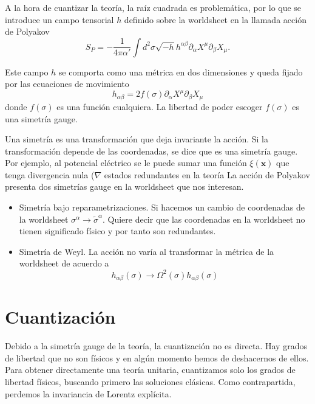 A la hora de cuantizar la teoría, la raíz cuadrada es problemática, por lo que se introduce
un campo tensorial $h$ definido sobre la worldsheet en la llamada acción de Polyakov
\begin{equation}
  S_P=-\frac{1}{4\pi\alpha'}\int d^2\sigma  \sqrt{-h}h^{\alpha\beta}\partial_\alpha X^\mu \partial_\beta X_\mu.
\end{equation}

Este campo $h$ se comporta como una métrica en dos dimensiones y queda fijado por las
ecuaciones de movimiento
\begin{equation}
  h_{\alpha\beta}=2f(\sigma)\partial_\alpha X^\mu \partial_\beta X_\mu
\end{equation}
donde $f(\sigma)$ es una función cualquiera. La libertad de poder escoger $f(\sigma)$
es una simetría gauge.

Una simetría es una transformación que deja invariante la acción. 
Si la transformación depende de las coordenadas, se dice que es una simetría gauge. 
Por ejemplo, al potencial eléctrico se le puede sumar una función $\xi(\mathbf x)$ que
tenga divergencia nula ($\nabla$
estados redundantes en la teoría
La acción de Polyakov presenta dos simetrías gauge en la worldsheet que nos interesan. 
\begin{itemize}
  \item Simetría bajo reparametrizaciones. 
    Si hacemos un cambio de coordenadas de la worldsheet $\sigma^\alpha \to \tilde \sigma^\alpha$. 
    Quiere decir que las coordenadas en la worldsheet no tienen significado físico y por tanto 
    son redundantes.
  \item Simetría de Weyl. La acción no varía al transformar la métrica de la worldsheet de acuerdo 
    a
    \begin{equation}
      h_{\alpha\beta}(\sigma) \to \Omega^2(\sigma) h_{\alpha\beta}(\sigma)
    \end{equation}
\end{itemize}



\section{Cuantización}

Debido a la simetría gauge de la teoría, la cuantización no es directa.
Hay grados de libertad que no son físicos y en algún momento hemos de deshacernos de ellos.
Para obtener directamente una teoría unitaria, cuantizamos solo los grados de libertad 
físicos, buscando primero las soluciones clásicas. 
Como contrapartida, perdemos la invariancia de Lorentz explícita.

